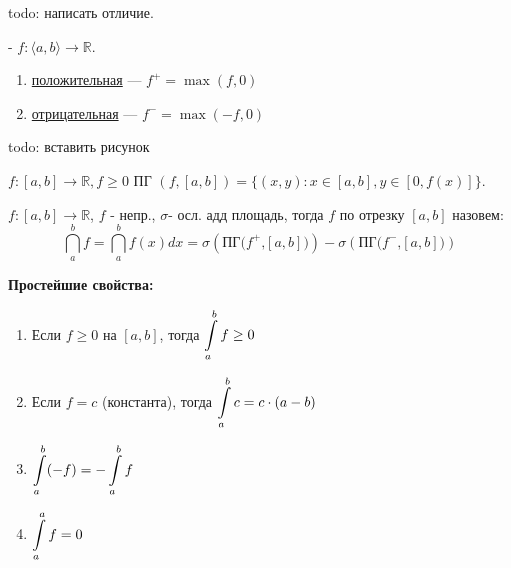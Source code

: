 todo: написать отличие.

  - $f:\langle a,b\rangle \rightarrow \mathbb{R} $.
\begin{enumerate}
    \item \uline{положительная} --- $f^+ = \max(f,0)$
    \item \uline{отрицательная} --- $f^- = \max(-f,0)$
\end{enumerate}

todo: вставить рисунок

 $f:[a,b] \rightarrow \mathbb{R}, f\geq 0$ ПГ $(f,[a,b]) = \{(x,y): x\in [a,b], y \in [0,f(x)]\}$.

 $f: [a,b] \rightarrow \mathbb{R}$, $f$ - непр., $\sigma $- осл. адд площадь, тогда  $f$ по отрезку $[a,b]$ назовем: $$\dint\limits_{a}^b f =\dint\limits_{a}^b f(x) dx =\sigma(\text{ПГ($f^+$,$[a,b]$)})-\sigma(\text{ПГ($f^-$,$[a,b]$)})$$

\textbf{Простейшие свойства:}
\begin{enumerate}
    \item Если $f \ge 0$ на $[a, b]$, тогда $\displaystyle\int\limits_{a}^{b}f \ge 0$
    \item Если $f = c$ (константа), тогда $\displaystyle\int\limits_{a}^{b}c = c \cdot (a - b)$
    \item $\displaystyle\int\limits_{a}^{b}(-f) = -\displaystyle\int\limits_{a}^{b}f$
    \item $\displaystyle\int\limits_{a}^{a}f = 0$
\end{enumerate}

